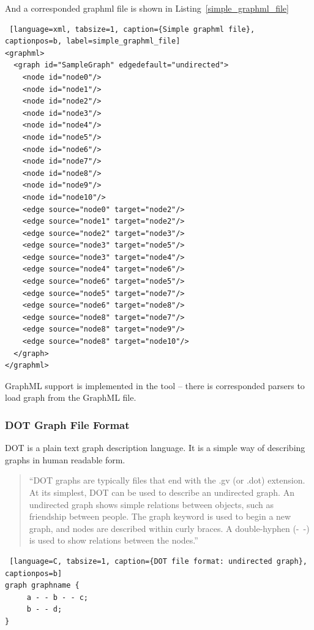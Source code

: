 And a corresponded graphml file is shown in Listing~\ref{simple_graphml_file}

\begin{center}
\renewcommand{\thelstlisting}{\thesection.\arabic{lstlisting}}
\begin{lstlisting} [language=xml, tabsize=1, caption={Simple graphml file}, captionpos=b, label=simple_graphml_file]
<graphml>
  <graph id="SampleGraph" edgedefault="undirected">
    <node id="node0"/>
    <node id="node1"/>
    <node id="node2"/>
    <node id="node3"/>
    <node id="node4"/>
    <node id="node5"/>
    <node id="node6"/>
    <node id="node7"/>
    <node id="node8"/>
    <node id="node9"/>
    <node id="node10"/>
    <edge source="node0" target="node2"/>
    <edge source="node1" target="node2"/>
    <edge source="node2" target="node3"/>
    <edge source="node3" target="node5"/>
    <edge source="node3" target="node4"/>
    <edge source="node4" target="node6"/>
    <edge source="node6" target="node5"/>
    <edge source="node5" target="node7"/>
    <edge source="node6" target="node8"/>
    <edge source="node8" target="node7"/>
    <edge source="node8" target="node9"/>
    <edge source="node8" target="node10"/>
  </graph>
</graphml>
\end{lstlisting}
\end{center}

GraphML support is implemented in the tool -- there is corresponded parsers to load graph from the GraphML file.

\subsubsection{DOT Graph File Format}
DOT is a plain text graph description language. It is a simple way of describing graphs in human readable form.

\begin{quotation}
``DOT graphs are typically files that end with the .gv (or .dot) extension.
At its simplest, DOT can be used to describe an undirected graph.
An undirected graph shows simple relations between objects, such as friendship between people.
The graph keyword is used to begin a new graph, and nodes are described within curly braces.
A double-hyphen (-\ -) is used to show relations between the nodes.''~\cite{DOT}
\end{quotation}

\begin{center}
\renewcommand{\thelstlisting}{\thesection.\arabic{lstlisting}}
\begin{lstlisting} [language=C, tabsize=1, caption={DOT file format: undirected graph}, captionpos=b]
graph graphname {
     a - - b - - c;
     b - - d;
}
\end{lstlisting}
\end{center}

